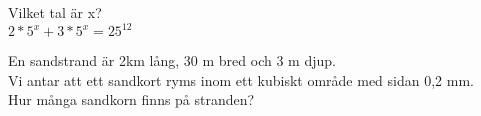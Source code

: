 
\begin{displayquote}
\textcolor{turkos}{Vilket tal är x?\\
\( 2*5^x + 3*5^x = 25^{12} \)}
\end{displayquote}


\begin{displayquote}
\textcolor{turkos}{En sandstrand är 2km lång, 30 m bred och 3 m djup. \\
Vi antar att ett sandkort ryms inom ett kubiskt område med sidan 0,2 mm.\\
Hur många sandkorn finns på stranden?}
\end{displayquote}


